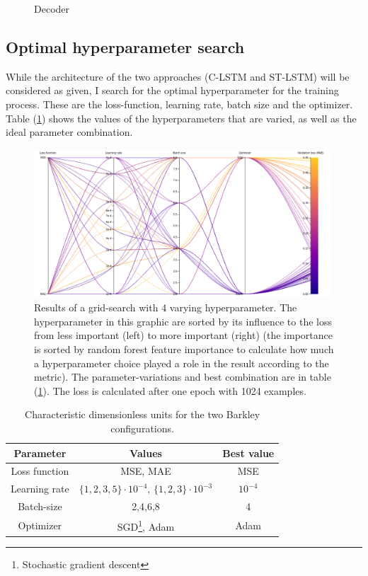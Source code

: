 \begin{figure}[!tbp]
\begin{minipage}[b]{0.4\textwidth}
    \caption{Decoder}
    \label{fig:decoder}
  \end{minipage}
\end{figure}

\subsection{Optimal hyperparameter search}
While the architecture of the two approaches (C-LSTM and ST-LSTM) will be considered as given, I search for the optimal hyperparameter for the training process. These are the loss-function, learning rate, batch size and the optimizer. Table (\ref{tab:gridsearch}) shows the values of the hyperparameters that are varied, as well as the ideal parameter combination.

\begin{figure}[ht]
    \center
    \includegraphics[width=0.99\textwidth]{figures/sweep_clstm.png}
	\caption{Results of a grid-search with 4 varying hyperparameter. The hyperparameter in this graphic are sorted by its influence to the loss from less important (left) to more important (right) (the importance is sorted by random forest feature importance to calculate how much a hyperparameter choice played a role in the result according to the metric). The parameter-variations and best combination are in table (\ref{tab:gridsearch}). The loss is calculated after one epoch with 1024 examples.}
	\label{fig:sweep_clstm}
\end{figure}

\begin{table}[h]
    \centering
    \begin{tabular}{|c|c|c|}
    \hline
    Parameter & Values & Best value\\
    \hline
    \hline
    Loss function & MSE, MAE & MSE\\
    \hline
    Learning rate & $\{1,2,3,5\}\cdot10^{-4}$, $\{1,2,3\}\cdot10^{-3}$ & $10^{-4}$\\
    \hline
    Batch-size & 2,4,6,8 & 4\\
    \hline
    Optimizer & SGD\footnote{Stochastic gradient descent}, Adam & Adam \\ %
    \hline
    \end{tabular}
    \caption{Characteristic dimensionless units for the two Barkley configurations.}
    \label{tab:gridsearch}
\end{table}

